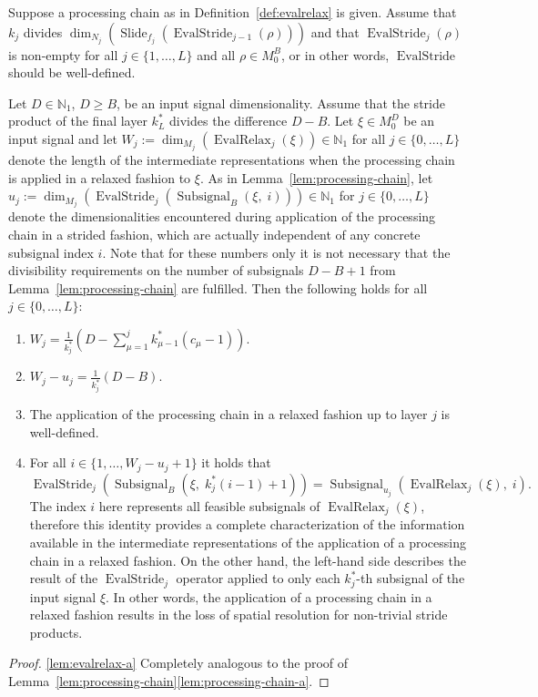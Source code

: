 \documentclass[journal]{IEEEtran}
\newcommand{\N}{\mathbb{N}}
\newcommand{\ROI}{B}
\newcommand{\discint}[2]{\{#1,\dotsc,#2\}}
\newcommand{\inint}[2]{\in\discint{#1}{#2}}
\DeclareMathOperator{\Subsignal}{Subsignal}
\DeclareMathOperator{\Slide}{Slide}
\DeclareMathOperator{\EvalStride}{EvalStride}
\DeclareMathOperator{\EvalRelax}{EvalRelax}
\begin{document}
\begin{lemma}
\label{lem:evalrelax}
Suppose a processing chain as in Definition~\ref{def:evalrelax} is given.
Assume that $k_j$ divides $\dim_{N_j}(\Slide_{f_j}(\EvalStride_{j - 1}(\rho)))$ and that $\EvalStride_{j}(\rho)$ is non-empty for all $j\inint{1}{L}$ and all $\rho\in M_0^\ROI$, or in other words, $\EvalStride$ should be well-defined.

Let $D\in\N_1$, $D\geq\ROI$, be an input signal dimensionality.
Assume that the stride product of the final layer $k_L^*$ divides the difference $D - \ROI$.
Let $\xi\in M_0^D$ be an input signal and let $W_j := \dim_{M_j}(\EvalRelax_j(\xi))\in\N_1$ for all $j\inint{0}{L}$ denote the length of the intermediate representations when the processing chain is applied in a relaxed fashion to $\xi$.
As in Lemma~\ref{lem:processing-chain}, let $u_j := \dim_{M_j}(\EvalStride_j(\Subsignal_\ROI(\xi,\; i)))\in\N_1$ for $j\inint{0}{L}$ denote the dimensionalities encountered during application of the processing chain in a strided fashion, which are actually independent of any concrete subsignal index $i$.
Note that for these numbers only it is not necessary that the divisibility requirements on the number of subsignals $D - \ROI + 1$ from Lemma~\ref{lem:processing-chain} are fulfilled.
Then the following holds for all $j\inint{0}{L}$:
\begin{enumerate}\setlength{\itemsep}{.5ex}
  \item \label{lem:evalrelax-a} $W_j = \frac{1}{k_j^*}\left(D - \sum_{\mu = 1}^j k_{\mu - 1}^*(c_\mu - 1)\right)$.
  \item \label{lem:evalrelax-b} $W_j - u_j = \frac{1}{k_j^*}(D - \ROI)$.
  \item \label{lem:evalrelax-c} The application of the processing chain in a relaxed fashion up to layer $j$ is well-defined.
  \item \label{lem:evalrelax-d} For all $i\inint{1}{W_j - u_j + 1}$ it holds that
        \begin{displaymath}
          \EvalStride_j(\Subsignal_\ROI(\xi,\; k_j^*(i - 1) + 1))
          = \Subsignal_{u_j}(\EvalRelax_j(\xi),\; i)\text{.}
        \end{displaymath}
        The index $i$ here represents all feasible subsignals of $\EvalRelax_j(\xi)$, therefore this identity provides a complete characterization of the information available in the intermediate representations of the application of a processing chain in a relaxed fashion.
        On the other hand, the left-hand side describes the result of the $\EvalStride_j$ operator applied to only each $k_j^*$-th subsignal of the input signal $\xi$.
        In other words, the application of a processing chain in a relaxed fashion results in the loss of spatial resolution for non-trivial stride products.
\end{enumerate}
\end{lemma}\begin{proof}
\ref{lem:evalrelax-a}
Completely analogous to the proof of Lemma~\ref{lem:processing-chain}\ref{lem:processing-chain-a}.


\end{proof}
\end{document}
